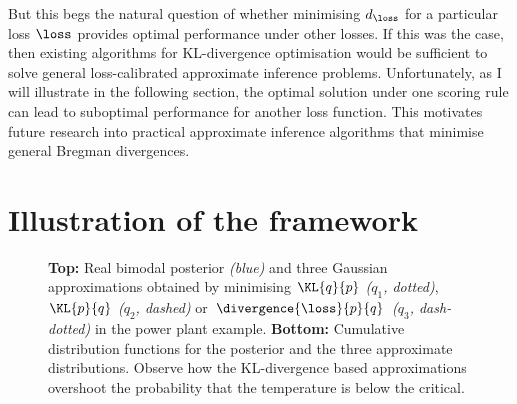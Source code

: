 But this begs the natural question of whether minimising $d_\loss$ for a particular loss $\loss$ provides optimal performance under other losses. If this was the case, then existing algorithms for KL-divergence optimisation would be sufficient to solve general loss-calibrated approximate inference problems. Unfortunately, as I will illustrate in the following section, the optimal solution under one scoring rule can lead to suboptimal performance for another loss function. This motivates future research into practical approximate inference algorithms that minimise general Bregman divergences.

\section{Illustration of the framework \label{sec:toy}}

\begin{figure}
\centering
{}
 \caption[Illustrating of approximate inference in a loss-critical toy example]{\textbf{Top:} Real bimodal posterior \emph{(blue)} and three Gaussian approximations obtained by minimising  $\KL{q}{p}$ \emph{($q_1$, dotted)}, $\KL{p}{q}$ \emph{($q_2$, dashed)} or $\divergence{\loss}{p}{q}$ \emph{($q_3$, dash-dotted)} in the power plant example. \textbf{Bottom:} Cumulative distribution functions for the posterior and the three approximate distributions. Observe how the KL-divergence based approximations overshoot the probability that the temperature is below the critical.}  \label{fig:toy}
\end{figure}

